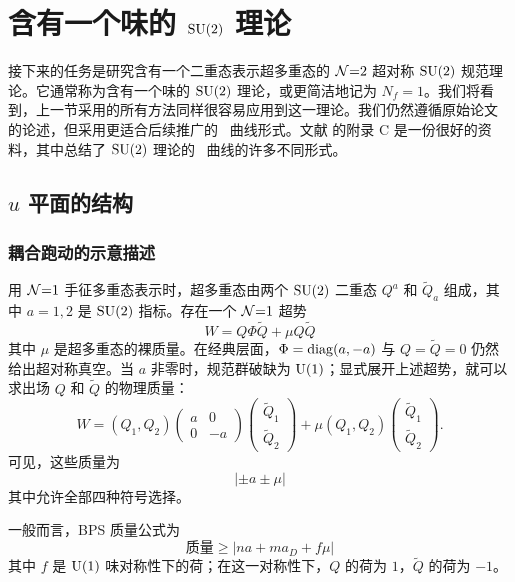\section{含有一个味的 $\mathop{\mathrm{SU}}(2)$ 理论}\label{sec:nf=1}
接下来的任务是研究含有一个二重态表示超多重态的 $\mathcal{N}{=}2$ 超对称 $\mathop{\mathrm{SU}}(2)$ 规范理论。它通常称为含有一个味的 $\mathop{\mathrm{SU}}(2)$ 理论，或更简洁地记为 $N_f=1$。我们将看到，上一节采用的所有方法同样很容易应用到这一理论。我们仍然遵循原始论文 \cite{Seiberg:1994aj} 的论述，但采用更适合后续推广的 \SeibergWitten\ 曲线形式。文献 \cite{Hollands:2010xa} 的附录 C 是一份很好的资料，其中总结了 $\mathop{\mathrm{SU}}(2)$ 理论的 \SeibergWitten\ 曲线的许多不同形式。

\subsection{$u$ 平面的结构}
\subsubsection{耦合跑动的示意描述}
用 $\mathcal{N}{=}1$ 手征多重态表示时，超多重态由两个 $\mathop{\mathrm{SU}}(2)$ 二重态 $Q^a$ 和 $\tilde Q_a$ 组成，其中 $a=1,2$ 是 $\mathop{\mathrm{SU}}(2)$ 指标。存在一个 $\mathcal{N}{=}1$ 超势
\begin{equation}
W=Q\Phi\tilde Q+\mu Q\tilde Q
\end{equation}
其中 $\mu$ 是超多重态的裸质量。在经典层面，$\Phi=\mathop{\mathrm{diag}}(a,-a)$ 与 $Q=\tilde Q=0$ 仍然给出超对称真空。当 $a$ 非零时，规范群破缺为 ${\mathrm{U}}(1)$；显式展开上述超势，就可以求出场 $Q$ 和 $\tilde Q$ 的物理质量：
\begin{equation}
W=(Q_1,Q_2)\begin{pmatrix}
a&0\\0&-a
\end{pmatrix}
\begin{pmatrix}\tilde Q_1\\\tilde Q_2\end{pmatrix}
+\mu(Q_1,Q_2)\begin{pmatrix}\tilde Q_1\\\tilde Q_2\end{pmatrix}.
\end{equation}
可见，这些质量为
\begin{equation}
|{\pm a\pm\mu}|\label{qmass}
\end{equation}
其中允许全部四种符号选择。

一般而言，BPS 质量公式为
\begin{equation}
\text{质量}\ge |na+ma_D+f\mu|\label{bps_nf_1}
\end{equation}
其中 $f$ 是 ${\mathrm{U}}(1)$ 味对称性下的荷；在这一对称性下，$Q$ 的荷为 $1$，$\tilde Q$ 的荷为 $-1$。


